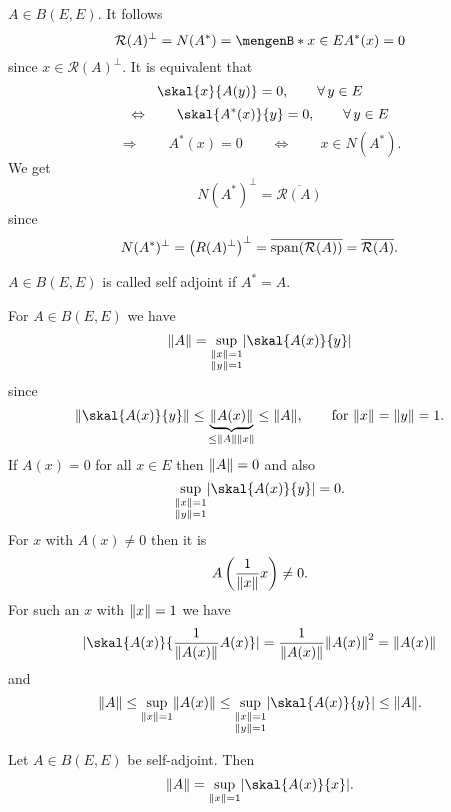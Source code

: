 \begin{beispiel}
	$A \in B(E,E)$. It follows
	\[
		\mathcal{R}(A)^{\perp} = N(A^*) = \set[x \in E]{A^*(x) = 0}
	\]
	since $x \in \mathcal{R}(A)^{\perp}$. It is equivalent that
	\[
		\skal{x}{A(y)} = 0, \qquad \forall\, y \in E
	\] 
	\[
		\Leftrightarrow \qquad \skal{A^*(x)}{y} = 0, \qquad \forall\, y \in E
	\]
	\[
		\Rightarrow \qquad A^*(x) = 0 \qquad \Leftrightarrow \qquad x \in N(A^*).
	\]
	We get
	\[
		N(A^*)^{\perp} = \overline{\mathcal{R}(A)}
	\]
	since
	\[
		N(A^*)^{\perp} = \left( R(A)^{\perp} \right)^{\perp} = \overline{\operatorname{span}(\mathcal{R}(A))} = \overline{\mathcal{R}(A)}.
	\]
\end{beispiel}
\begin{bemerkung}
	$A \in B(E,E)$ is called self adjoint if $A^* = A$.
\end{bemerkung}
For $A \in B(E,E)$ we have
\[
	\norm{A} =\sup\limits_{\substack{\norm{x} = 1  \\ \norm{y}=1}} \abs{\skal{A(x)}{y}}
\]
since
\[
	\norm{\skal{A(x)}{y}} \leq \underset{\leq \norm{A}\norm{x}}{\underbrace{\norm{A(x)}}} \leq \norm{A}, \qquad \text{for }\norm{x}=\norm{y}=1.
\]
If $A(x) = 0$ for all $x \in E$ then $\norm{A}=0$ and also
\[
	\sup\limits_{\substack{\norm{x} = 1  \\ \norm{y}=1}} \abs{\skal{A(x)}{y}} = 0.
\]
For $x$ with $A(x) \neq 0$ then it is
\[
	A \left( \frac{1}{\norm{x}}x \right) \neq 0.
\]
For such an $x$ with $\norm{x}=1$ we have
\[
	\abs{\skal{A(x)}{\frac{1}{\norm{A(x)}}A(x)}} = \frac{1}{\norm{A(x)}} \norm{A(x)}^2 = \norm{A(x)}
\]
and
\[
	\norm{A} \leq \sup_{\norm{x}=1} \norm{A(x)} \leq \sup\limits_{\substack{\norm{x} = 1  \\ \norm{y}=1}} \abs{\skal{A(x)}{y}} \leq \norm{A}.
\]
\begin{proposition}
	Let $A \in B(E,E)$ be self-adjoint. Then
	\[
		\norm{A} = \sup_{\norm{x}=1} \abs{\skal{A(x)}{x}}.
	\]
\end{proposition}

